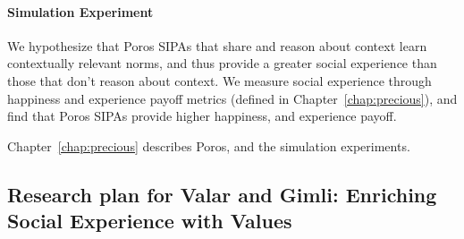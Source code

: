 \documentclass[11pt,          %
               phd,           %
               onehalfspacing %
               ]{ncsuthesis}
\newcommand{\fsl}{\textsl}
\newcommand{\frameworkB}{Poros\xspace}
\newcommand{\frameworkC}{Valar\xspace}
\newcommand{\frameworkD}{Gimli\xspace}
\begin{document}
\paragraph*{Simulation Experiment}
We hypothesize that \frameworkB SIPAs that share and reason about
context learn contextually relevant norms, and thus provide a greater
social experience than those that don't reason about context. We measure
social experience through happiness and experience payoff metrics
(defined in Chapter~\ref{chap:precious}), and find that \frameworkB
SIPAs provide higher happiness, and experience payoff.

Chapter~\ref{chap:precious} describes \frameworkB, and the simulation experiments. 


%
%

\subsection[Enriching Social Experience with Values]{Research plan for \frameworkC and \frameworkD: Enriching Social Experience with Values}
\end{document}

